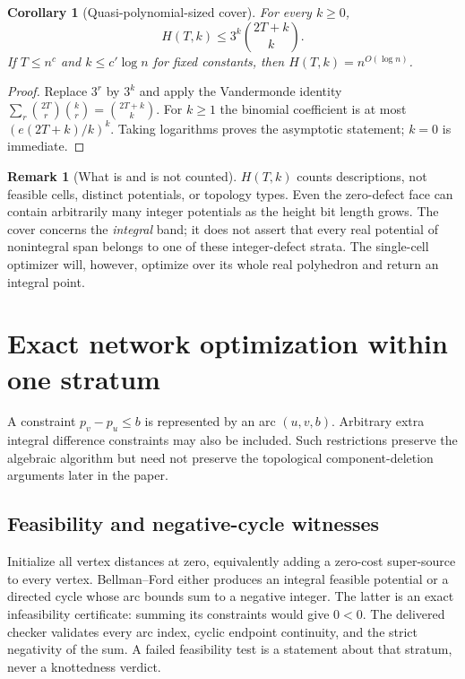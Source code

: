 \documentclass[11pt,letterpaper]{article}
\newtheorem{corollary}[theorem]{Corollary}
\theoremstyle{definition}
\newtheorem{remark}[theorem]{Remark}
\begin{document}
\begin{corollary}[Quasi-polynomial-sized cover]\label{cor:count}
For every $k\geq0$,
\[
 H(T,k)\leq3^k\binom{2T+k}{k}.
\]
If $T\leq n^c$ and $k\leq c'\log n$ for fixed constants, then $H(T,k)=n^{O(\log n)}$.
\end{corollary}
\begin{proof}
Replace $3^r$ by $3^k$ and apply the Vandermonde identity
$\sum_r\binom{2T}{r}\binom{k}{r}=\binom{2T+k}{k}$.
For $k\geq1$ the binomial coefficient is at most $(e(2T+k)/k)^k$. Taking logarithms proves the asymptotic statement; $k=0$ is immediate.
\end{proof}

\begin{remark}[What is and is not counted]
$H(T,k)$ counts descriptions, not feasible cells, distinct potentials, or topology types. Even the zero-defect face can contain arbitrarily many integer potentials as the height bit length grows. The cover concerns the \emph{integral} band; it does not assert that every real potential of nonintegral span belongs to one of these integer-defect strata. The single-cell optimizer will, however, optimize over its whole real polyhedron and return an integral point.
\end{remark}

\section{Exact network optimization within one stratum}\label{sec:network}
A constraint $p_v-p_u\leq b$ is represented by an arc $(u,v,b)$. Arbitrary extra integral difference constraints may also be included. Such restrictions preserve the algebraic algorithm but need not preserve the topological component-deletion arguments later in the paper.

\subsection{Feasibility and negative-cycle witnesses}
Initialize all vertex distances at zero, equivalently adding a zero-cost super-source to every vertex. Bellman--Ford either produces an integral feasible potential or a directed cycle whose arc bounds sum to a negative integer. The latter is an exact infeasibility certificate: summing its constraints would give $0<0$. The delivered checker validates every arc index, cyclic endpoint continuity, and the strict negativity of the sum. A failed feasibility test is a statement about that stratum, never a knottedness verdict.
\end{document}
